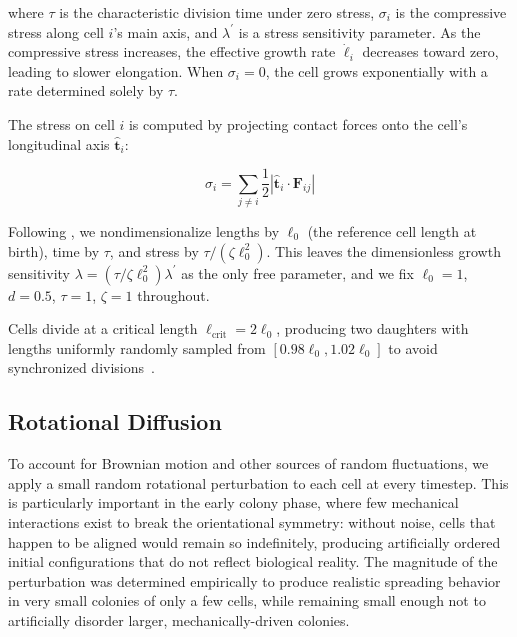 \documentclass[a4paper,fleqn]{cas-dc}
\begin{document}
where $\tau$ is the characteristic division time under zero stress, $\sigma_i$ is the compressive stress along cell $i$'s main axis, and $\lambda^{'}$ is a stress sensitivity parameter. As the compressive stress increases, the effective growth rate $\dot{\ell}_i$ decreases toward zero, leading to slower elongation. When $\sigma_i = 0$, the cell grows exponentially with a rate determined solely by $\tau$.

The stress on cell $i$ is computed by projecting contact forces onto the cell's longitudinal axis $\hat{\mathbf{t}}_i$:

\begin{equation} \label{eq:stress}
    \sigma_i = \sum_{j \neq i} \frac{1}{2} \left| \hat{\mathbf{t}}_i \cdot \mathbf{F}_{ij} \right|
\end{equation}

Following \cite{Weady2024SM}, we nondimensionalize lengths by $\ell_0$ (the reference cell length at birth), time by $\tau$, and stress by $\tau / (\zeta \ell_0^2)$. This leaves the dimensionless growth sensitivity $\lambda = (\tau / \zeta \ell_0^2)\lambda^{'}$ as the only free parameter, and we fix $\ell_0 = 1$, $d = 0.5$, $\tau = 1$, $\zeta = 1$ throughout.

Cells divide at a critical length $\ell_{\text{crit}} = 2 \ell_0$, producing two daughters with lengths uniformly randomly sampled from $\left[0.98 \ell_0, 1.02 \ell_0 \right]$ to avoid synchronized divisions~\cite{You2018}.

\subsection{Rotational Diffusion}

To account for Brownian motion and other sources of random fluctuations, we apply a small random rotational perturbation to each cell at every timestep. This is particularly important in the early colony phase, where few mechanical interactions exist to break the orientational symmetry: without noise, cells that happen to be aligned would remain so indefinitely, producing artificially ordered initial configurations that do not reflect biological reality. The magnitude of the perturbation was determined empirically to produce realistic spreading behavior in very small colonies of only a few cells, while remaining small enough not to artificially disorder larger, mechanically-driven colonies.
\end{document}
